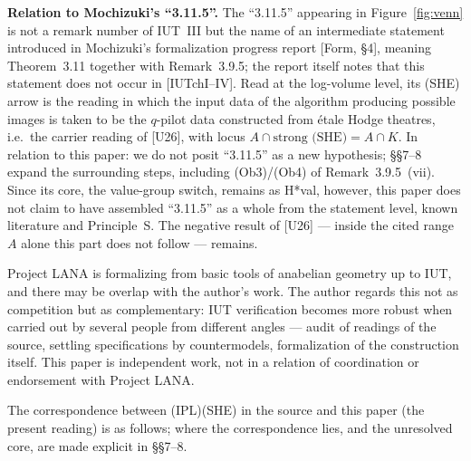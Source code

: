 \documentclass[11pt]{article}
\begin{document}
\textbf{Relation to Mochizuki's ``3.11.5''.}  The ``3.11.5''
appearing in Figure~\ref{fig:venn} is not a remark number of
IUT~III but the name of an intermediate statement introduced in
Mochizuki's formalization progress report [Form, \S4], meaning
Theorem~3.11 together with Remark~3.9.5; the report itself notes
that this statement does not occur in [IUTchI--IV].  Read at the
log-volume level, its (SHE) arrow is the reading in which the input
data of the algorithm producing possible images is taken to be the
$q$-pilot data constructed from \'etale Hodge theatres, i.e.\ the
carrier reading of [U26], with locus
$A\cap\text{strong (SHE)}=A\cap K$.  In relation to this paper: we
do not posit ``3.11.5'' as a new hypothesis; \S\S7--8 expand the
surrounding steps, including (Ob3)/(Ob4) of Remark~3.9.5~(vii).
Since its core, the value-group switch, remains as H*val, however,
this paper does not claim to have assembled ``3.11.5'' as a whole
from the statement level, known literature and Principle~S.  The
negative result of [U26] --- inside the cited range $A$ alone this
part does not follow --- remains.

Project LANA is formalizing from basic tools of anabelian geometry
up to IUT, and there may be overlap with the author's work.  The
author regards this not as competition but as complementary: IUT
verification becomes more robust when carried out by several people
from different angles --- audit of readings of the source, settling
specifications by countermodels, formalization of the construction
itself.  This paper is independent work, not in a relation of
coordination or endorsement with Project LANA.

The correspondence between (IPL)(SHE) in the source and this paper
(the present reading) is as follows; where the correspondence lies,
and the unresolved core, are made explicit in \S\S7--8.
\end{document}
